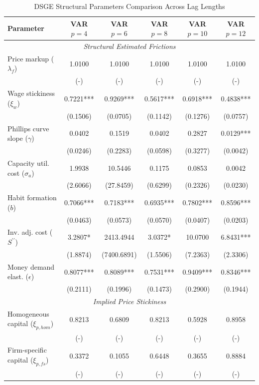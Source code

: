 \begin{table}[htpb]
    \centering
    \small
    \renewcommand{\arraystretch}{1.2}
    \caption{DSGE Structural Parameters Comparison Across Lag Lengths}
    \label{tab:dsge_params_comparison}
    \begin{tabular}{lccccc}
    \toprule
    \textbf{Parameter} & \textbf{VAR $p=4$} & \textbf{VAR $p=6$} & \textbf{VAR $p=8$} & \textbf{VAR $p=10$} & \textbf{VAR $p=12$} \\
    \midrule \multicolumn{6}{c}{\textit{Structural Estimated Frictions}} \\
    Price markup ($\lambda_f$) & 1.0100 & 1.0100 & 1.0100 & 1.0100 & 1.0100 \\
    & (-) & (-) & (-) & (-) & (-) \\
    Wage stickiness ($\xi_w$) & 0.7221*** & 0.9269*** & 0.5617*** & 0.6918*** & 0.4838*** \\
    & (0.1506) & (0.0705) & (0.1142) & (0.1276) & (0.0757) \\
    Phillips curve slope ($\gamma$) & 0.0402 & 0.1519 & 0.0402 & 0.2827 & 0.0129*** \\
    & (0.0246) & (0.2283) & (0.0598) & (0.3277) & (0.0042) \\
    Capacity util. cost ($\sigma_a$) & 1.9938 & 10.5446 & 0.1175 & 0.0853 & 0.0042 \\
    & (2.6066) & (27.8459) & (0.6299) & (0.2326) & (0.0230) \\
    Habit formation ($b$) & 0.7066*** & 0.7183*** & 0.6935*** & 0.7802*** & 0.8596*** \\
    & (0.0463) & (0.0573) & (0.0570) & (0.0407) & (0.0203) \\
    Inv. adj. cost ($S^{\prime\prime}$) & 3.2807* & 2413.4944 & 3.0372* & 10.0700 & 6.8431*** \\
    & (1.8874) & (7400.6891) & (1.5506) & (7.2363) & (2.3306) \\
    Money demand elast. ($\epsilon$) & 0.8077*** & 0.8089*** & 0.7531*** & 0.9409*** & 0.8346*** \\
    & (0.2111) & (0.1996) & (0.1473) & (0.2900) & (0.1944) \\
    \midrule \multicolumn{6}{c}{\textit{Implied Price Stickiness}} \\
    Homogeneous capital ($\xi_{p, hom}$) & 0.8213 & 0.6809 & 0.8213 & 0.5928 & 0.8958 \\
    & (-) & (-) & (-) & (-) & (-) \\
    Firm-specific capital ($\xi_{p, fs}$) & 0.3372 & 0.1055 & 0.6448 & 0.3655 & 0.8884 \\
    & (-) & (-) & (-) & (-) & (-) \\
    \bottomrule
    \end{tabular}
\end{table}
